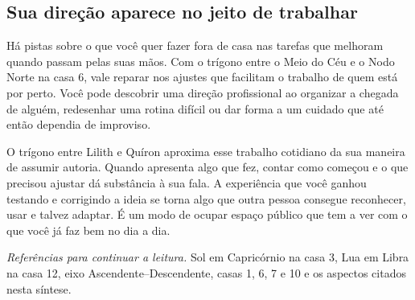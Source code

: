 \documentclass[11pt,a4paper]{article}
\begin{document}
\subsection*{Sua direção aparece no jeito de trabalhar}

Há pistas sobre o que você quer fazer fora de casa nas tarefas que melhoram quando passam pelas suas mãos. Com o trígono entre o Meio do Céu e o Nodo Norte na casa 6, vale reparar nos ajustes que facilitam o trabalho de quem está por perto. Você pode descobrir uma direção profissional ao organizar a chegada de alguém, redesenhar uma rotina difícil ou dar forma a um cuidado que até então dependia de improviso.

O trígono entre Lilith e Quíron aproxima esse trabalho cotidiano da sua maneira de assumir autoria. Quando apresenta algo que fez, contar como começou e o que precisou ajustar dá substância à sua fala. A experiência que você ganhou testando e corrigindo a ideia se torna algo que outra pessoa consegue reconhecer, usar e talvez adaptar. É um modo de ocupar espaço público que tem a ver com o que você já faz bem no dia a dia.

\medskip
{\small\textit{Referências para continuar a leitura.} Sol em Capricórnio na casa 3, Lua em Libra na casa 12, eixo Ascendente--Descendente, casas 1, 6, 7 e 10 e os aspectos citados nesta síntese.}
\end{document}
